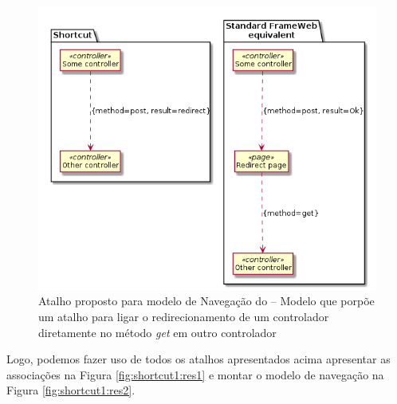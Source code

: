 \begin{figure}[H]
	\centering
	\includegraphics[scale=0.5]{figuras/navigation-shortcut2.png}
	\caption{Atalho proposto para modelo de Navegação do \imprimirtitulo{} -- Modelo que porpõe um atalho para ligar o redirecionamento de um controlador diretamente no método \textit{get} em outro controlador}
	\label{fig:shortcut2}
\end{figure}

Logo, podemos fazer uso de todos os atalhos apresentados acima apresentar as associações na Figura \ref{fig:shortcut1:res1} e montar o modelo de navegação na Figura \ref{fig:shortcut1:res2}.

